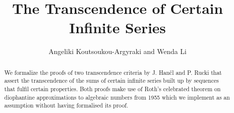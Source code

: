 \documentclass[11pt,a4paper]{article}
\begin{document}
\title{The Transcendence of Certain Infinite Series}
\author{Angeliki Koutsoukou-Argyraki and Wenda Li}
\maketitle

\begin{abstract}
We formalize the proofs of two transcendence criteria by J. Han\v{c}l and P. Rucki that
assert the transcendence of the sums of certain infinite series built up by sequences that 
fulfil certain properties. 
Both proofs make use of Roth's celebrated theorem on diophantine approximations to algebraic numbers 
from 1955  which we implement as an assumption without having formalised its proof.


\end{abstract}


\tableofcontents



\nocite{apostol1976analytic}


\end{document}
